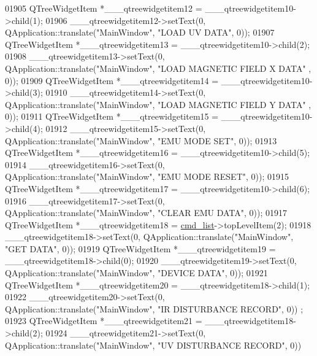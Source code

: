 \begin{DoxyCode}
01905         QTreeWidgetItem *\_\_\_qtreewidgetitem12 = \_\_\_qtreewidgetitem10->child(1);
01906         \_\_\_qtreewidgetitem12->setText(0, QApplication::translate(\textcolor{stringliteral}{"MainWindow"}, \textcolor{stringliteral}{"LOAD UV DATA"}, 0));
01907         QTreeWidgetItem *\_\_\_qtreewidgetitem13 = \_\_\_qtreewidgetitem10->child(2);
01908         \_\_\_qtreewidgetitem13->setText(0, QApplication::translate(\textcolor{stringliteral}{"MainWindow"}, \textcolor{stringliteral}{"LOAD MAGNETIC FIELD X DATA"}
      , 0));
01909         QTreeWidgetItem *\_\_\_qtreewidgetitem14 = \_\_\_qtreewidgetitem10->child(3);
01910         \_\_\_qtreewidgetitem14->setText(0, QApplication::translate(\textcolor{stringliteral}{"MainWindow"}, \textcolor{stringliteral}{"LOAD MAGNETIC FIELD Y DATA"}
      , 0));
01911         QTreeWidgetItem *\_\_\_qtreewidgetitem15 = \_\_\_qtreewidgetitem10->child(4);
01912         \_\_\_qtreewidgetitem15->setText(0, QApplication::translate(\textcolor{stringliteral}{"MainWindow"}, \textcolor{stringliteral}{"EMU MODE SET"}, 0));
01913         QTreeWidgetItem *\_\_\_qtreewidgetitem16 = \_\_\_qtreewidgetitem10->child(5);
01914         \_\_\_qtreewidgetitem16->setText(0, QApplication::translate(\textcolor{stringliteral}{"MainWindow"}, \textcolor{stringliteral}{"EMU MODE RESET"}, 0));
01915         QTreeWidgetItem *\_\_\_qtreewidgetitem17 = \_\_\_qtreewidgetitem10->child(6);
01916         \_\_\_qtreewidgetitem17->setText(0, QApplication::translate(\textcolor{stringliteral}{"MainWindow"}, \textcolor{stringliteral}{"CLEAR EMU DATA"}, 0));
01917         QTreeWidgetItem *\_\_\_qtreewidgetitem18 = \hyperlink{a00027_aa66ece71395b435e915d384fb63bac1d}{cmd\_list}->topLevelItem(2);
01918         \_\_\_qtreewidgetitem18->setText(0, QApplication::translate(\textcolor{stringliteral}{"MainWindow"}, \textcolor{stringliteral}{"GET DATA"}, 0));
01919         QTreeWidgetItem *\_\_\_qtreewidgetitem19 = \_\_\_qtreewidgetitem18->child(0);
01920         \_\_\_qtreewidgetitem19->setText(0, QApplication::translate(\textcolor{stringliteral}{"MainWindow"}, \textcolor{stringliteral}{"DEVICE DATA"}, 0));
01921         QTreeWidgetItem *\_\_\_qtreewidgetitem20 = \_\_\_qtreewidgetitem18->child(1);
01922         \_\_\_qtreewidgetitem20->setText(0, QApplication::translate(\textcolor{stringliteral}{"MainWindow"}, \textcolor{stringliteral}{"IR DISTURBANCE RECORD"}, 0))
      ;
01923         QTreeWidgetItem *\_\_\_qtreewidgetitem21 = \_\_\_qtreewidgetitem18->child(2);
01924         \_\_\_qtreewidgetitem21->setText(0, QApplication::translate(\textcolor{stringliteral}{"MainWindow"}, \textcolor{stringliteral}{"UV DISTURBANCE RECORD"}, 0))

\end{DoxyCode}

